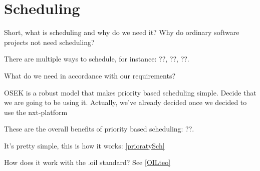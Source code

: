 \section{Scheduling} \label{analysis:scheduling}

Short, what is scheduling and why do we need it? Why do ordinary software projects not need scheduling?

There are multiple ways to schedule, for instance: ??, ??, ??.

What do we need in accordance with our requirements? 

OSEK is a robust model that makes priority based scheduling simple. Decide that we are going to be using it. Actually, we've already decided once we decided to use the nxt-platform

These are the overall benefits of priority based scheduling: ??.

It's pretty simple, this is how it works: \ref{prioratySch}

How does it work with the .oil standard? See \ref{OILteo}
